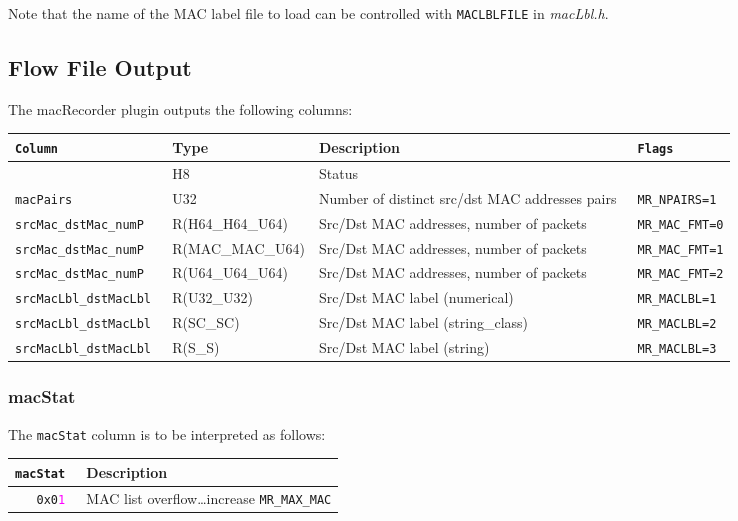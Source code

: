 \documentclass[documentation]{subfiles}
\begin{document}
Note that the name of the MAC label file to load can be controlled with {\tt MACLBLFILE} in {\em macLbl.h}.

\subsection{Flow File Output}
The macRecorder plugin outputs the following columns:
\begin{longtable}{>{\tt}l>{\small}ll>{\tt\small}l}
    \toprule
    {\bf Column} & {\bf Type} & {\bf Description} & {\bf Flags}\\
    \midrule\endhead%
    \nameref{macStat}      & H8               & Status\\
    macPairs               & U32              & Number of distinct src/dst MAC addresses pairs & MR\_NPAIRS=1\\
    srcMac\_dstMac\_numP   & R(H64\_H64\_U64) & Src/Dst MAC addresses, number of packets       & MR\_MAC\_FMT=0\\
    srcMac\_dstMac\_numP   & R(MAC\_MAC\_U64) & Src/Dst MAC addresses, number of packets       & MR\_MAC\_FMT=1\\
    srcMac\_dstMac\_numP   & R(U64\_U64\_U64) & Src/Dst MAC addresses, number of packets       & MR\_MAC\_FMT=2\\
    srcMacLbl\_dstMacLbl   & R(U32\_U32)      & Src/Dst MAC label (numerical)                  & MR\_MACLBL=1\\
    srcMacLbl\_dstMacLbl   & R(SC\_SC)        & Src/Dst MAC label (string\_class)              & MR\_MACLBL=2\\
    srcMacLbl\_dstMacLbl   & R(S\_S)          & Src/Dst MAC label (string)                     & MR\_MACLBL=3\\
    \bottomrule
\end{longtable}

\subsubsection{macStat}\label{macStat}
The {\tt macStat} column is to be interpreted as follows:
\begin{longtable}{>{\tt}rl}
    \toprule
    {\bf macStat} & {\bf Description}\\
    \midrule\endhead%
    0x0\textcolor{magenta}{1} & MAC list overflow\ldots increase {\tt MR\_MAX\_MAC}\\
    \bottomrule
\end{longtable}
\end{document}
